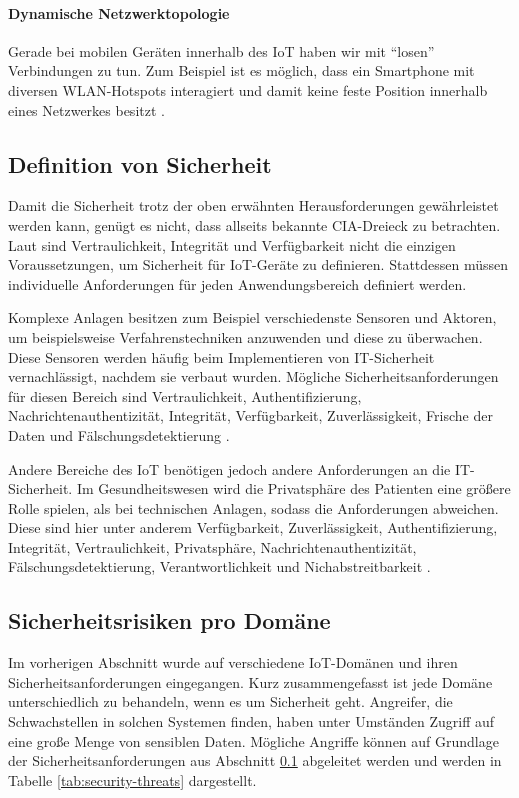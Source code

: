 \paragraph{Dynamische Netzwerktopologie}
Gerade bei mobilen Geräten innerhalb des IoT haben wir mit ``losen'' Verbindungen
zu tun. Zum Beispiel ist es möglich, dass ein Smartphone mit diversen
WLAN-Hotspots interagiert und damit keine feste Position innerhalb eines
Netzwerkes besitzt \cite{paper}.

\subsection{Definition von Sicherheit}\label{sec:def-security}
Damit die Sicherheit trotz der oben erwähnten Herausforderungen ge\-währ\-lei\-stet
werden kann, genügt es nicht, dass allseits bekannte CIA-Dreieck zu betrachten.
Laut \cite{paper} sind Vertraulichkeit, Integrität und Verfügbarkeit nicht die
einzigen Voraussetzungen, um Sicherheit für IoT-Geräte zu definieren.
Stattdessen müssen individuelle Anforderungen für jeden Anwendungsbereich
definiert werden.

Komplexe Anlagen besitzen zum Beispiel verschiedenste Sensoren und Aktoren, um
beispielsweise Verfahrenstechniken anzuwenden und diese zu über\-wachen. Diese
Sensoren werden häufig beim Implementieren von IT-Sich\-er\-heit vernachlässigt,
nachdem sie verbaut wurden. Mögliche Sicherheitsanforderungen für
diesen Bereich sind Vertraulichkeit, Authentifizierung,
Nachrichtenauthentizität, Integrität, Verfügbarkeit, Zuverlässigkeit, Frische
der Daten und Fälschungsdetektierung \cite{paper}.

Andere Bereiche des IoT benötigen jedoch andere Anforderungen an die
IT-Sicherheit. Im Gesundheitswesen wird die Privatsphäre des Patienten eine
größere Rolle spielen, als bei technischen Anlagen, sodass die Anforderungen
abweichen. Diese sind hier unter anderem Verfügbarkeit, Zuverlässigkeit,
Authentifizierung, Integrität, Vertraulichkeit, Privatsphäre,
Nachrichtenauthentizität, Fälschungsdetektierung, Verantwortlichkeit und
Nichabstreitbarkeit \cite{paper}.

\subsection{Sicherheitsrisiken pro Domäne}
Im vorherigen Abschnitt wurde auf verschiedene IoT-Domänen und ihren
Sicherheitsanforderungen eingegangen. Kurz zusammengefasst ist jede Domäne
unterschiedlich zu behandeln, wenn es um Sicherheit geht. Angreifer, die
Schwachstellen in solchen Systemen finden, haben unter Umständen Zugriff auf
eine große Menge von sensiblen Daten. Mögliche Angriffe können auf Grundlage der
Sicherheitsanforderungen aus Abschnitt \ref{sec:def-security} abgeleitet werden
\cite{paper} und werden in Tabelle \ref{tab:security-threats} dargestellt.

